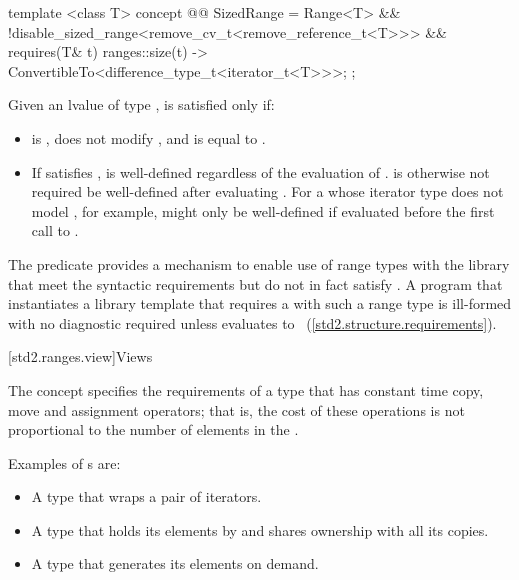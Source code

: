 \begin{itemdecl}
template <class T>
concept @@ SizedRange =
  Range<T> &&
  !disable_sized_range<remove_cv_t<remove_reference_t<T>>> &&
  requires(T& t) {
    { ranges::size(t) } -> ConvertibleTo<difference_type_t<iterator_t<T>>>;
  };
\end{itemdecl}

\begin{itemdescr}
\pnum
Given an lvalue  of type ,  is satisfied only if:

\begin{itemize}
\item {} is , does not modify , and is equal
to .

\item If  satisfies ,
 is well-defined regardless of the evaluation of
. \enternote {} is otherwise not required be
well-defined after evaluating . For a 
whose iterator type does not model , for
example,  might only be well-defined if evaluated before
the first call to . \exitnote
\end{itemize}

\pnum
\enternote The  predicate provides a mechanism to enable use
of range types with the library that meet the syntactic requirements but do
not in fact satisfy . A program that instantiates a library template
that requires a  with such a range type  is ill-formed with no
diagnostic required unless
 evaluates
to ~(\ref{std2.structure.requirements}). \exitnote
\end{itemdescr}

[std2.ranges.view]{Views}

\pnum
The  concept specifies the requirements of a
 type that has constant time copy, move and assignment operators; that
is, the cost of these operations is not proportional to the number of elements in
the .

\pnum
\enterexample
Examples of s are:

\begin{itemize}
\item A  type that wraps a pair of iterators.

\item A  type that holds its elements by 
and shares ownership with all its copies.

\item A  type that generates its elements on demand.
\end{itemize}

